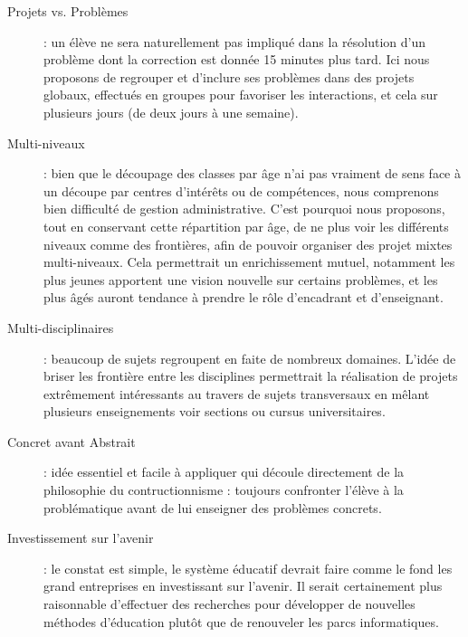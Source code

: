 \begin{description}
  \item[Projets vs. Problèmes] : un élève ne sera naturellement pas impliqué dans la résolution d'un problème dont la correction est donnée 15 minutes plus tard. Ici nous proposons de regrouper et d'inclure ses problèmes dans des projets globaux, effectués en groupes pour favoriser les interactions, et cela sur plusieurs jours (de deux jours à une semaine).
  \item[Multi-niveaux] : bien que le découpage des classes par âge n'ai pas vraiment de sens face à un découpe par centres d'intérêts ou de compétences, nous comprenons bien difficulté de gestion administrative. C'est pourquoi nous proposons, tout en conservant cette répartition par âge, de ne plus voir les différents niveaux comme des frontières, afin de pouvoir organiser des projet mixtes multi-niveaux. Cela permettrait un enrichissement mutuel, notamment les plus jeunes apportent une vision nouvelle sur certains problèmes, et les plus âgés auront tendance à prendre le rôle d'encadrant et d'enseignant.
  \item[Multi-disciplinaires] : beaucoup de sujets regroupent en faite de nombreux domaines. L'idée de briser les frontière entre les disciplines permettrait la réalisation de projets extrêmement intéressants au travers de sujets transversaux en mêlant plusieurs enseignements voir sections ou cursus universitaires.
  \item[Concret avant Abstrait] : idée essentiel et facile à appliquer qui découle directement de la philosophie du contructionnisme : toujours confronter l'élève à la problématique avant de lui enseigner des problèmes concrets.
  \item[Investissement sur l'avenir] : le constat est simple, le système éducatif devrait faire comme le fond les grand entreprises en investissant sur l'avenir. Il serait certainement plus raisonnable d'effectuer des recherches pour développer de nouvelles méthodes d'éducation plutôt que de renouveler les parcs informatiques.
\end{description}